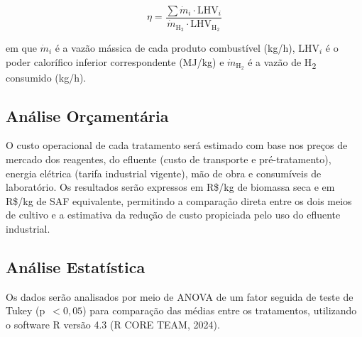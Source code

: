 \begin{equation}
    \eta = \frac{\sum \dot{m}_i \cdot \text{LHV}_i}{\dot{m}_{\text{H}_2}
    \cdot \text{LHV}_{\text{H}_2}}
    \label{eq:eficiencia}
\end{equation}

em que $\dot{m}_i$ é a vazão mássica de cada produto combustível (kg/h),
$\text{LHV}_i$ é o poder calorífico inferior correspondente (MJ/kg) e
$\dot{m}_{\text{H}_2}$ é a vazão de H\textsubscript{2} consumido (kg/h).

\subsection{Análise Orçamentária}

O custo operacional de cada tratamento será estimado com base nos preços
de mercado dos reagentes, do efluente (custo de transporte e pré-tratamento),
energia elétrica (tarifa industrial vigente), mão de obra e consumíveis de
laboratório. Os resultados serão expressos em R\$/kg de biomassa seca e
em R\$/kg de SAF equivalente, permitindo a comparação direta entre os
dois meios de cultivo e a estimativa da redução de custo propiciada pelo
uso do efluente industrial.

\subsection{Análise Estatística}

Os dados serão analisados por meio de ANOVA de um fator seguida de teste
de Tukey (p~$< 0{,}05$) para comparação das médias entre os tratamentos,
utilizando o software R versão 4.3 (R CORE TEAM, 2024).

